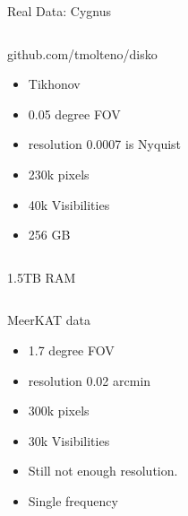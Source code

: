 \documentclass[ignorenonframetext]{beamer}
\begin{document}
\begin{frame}{Real Data: Cygnus}
 \begin{columns}[T]
  \begin{column}{0.4\linewidth}
github.com/tmolteno/disko
\begin{itemize}
\item Tikhonov
\item 0.05 degree FOV
\item resolution 0.0007 is Nyquist
\item 230k pixels
\item 40k Visibilities
 \item 256 GB
\end{itemize}
  \end{column}
  \begin{column}{0.6\linewidth}
  \begin{center}
   \texttt{[image: \{fig/cygnus]}.png} 
\end{center}     \end{column}
 \end{columns}
\end{frame}

\begin{frame}{1.5TB RAM}
 \begin{columns}[T]
  \begin{column}{0.4\linewidth}
MeerKAT data
\begin{itemize}
\item 1.7 degree FOV
\item resolution 0.02 arcmin
\item 300k pixels
\item 30k Visibilities
 \item Still not enough resolution.
 \item Single frequency
\end{itemize}
  \end{column}
  \begin{column}{0.6\linewidth}
  \begin{center}
    \texttt{[image: \{fig/bubbles36k300k]}.jpeg} 
\end{center}     
\end{column}
 \end{columns}
\end{frame}
\end{document}
